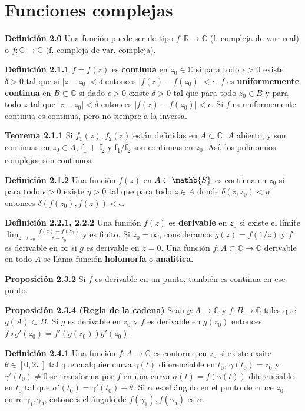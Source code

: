 \documentclass[a4paper, 11pt]{extarticle}
\newcommand{\tma}[1]{\textcolor{rojo}{\textbf{Teorema #1}}}
\newcommand{\propo}[1]{\textcolor{rojo}{\textbf{Proposición #1}}}
\newcommand{\defi}[1]{\textcolor{azul}{\textbf{Definición #1}}}
\begin{document}
\section*{Funciones complejas}
\label{sec:org47938e2}
\begin{multicols*}{2}
\defi{2.0} Una función puede ser de tipo \(f: \mathbb{R} \rightarrow
\mathbb{C}\) (f. compleja de var. real) o 
\(f: \mathbb{C} \rightarrow  \mathbb{C}\) (f. compleja de var. compleja).

\defi{2.1.1} \(f = f(z)\) es \textbf{continua} en \(z_0 \in \mathbb{C}\) si para todo \(\epsilon > 0\) existe \(\delta > 0\) tal que si \(|z - z_0| < \delta\)
entonces \(|f(z) - f(z_0)| < \epsilon\). \(f\) es \textbf{uniformemente continua} en
\(B \subset \mathbb{C}\) si
dado \(\epsilon > 0\) existe \(\delta > 0\) tal que para todo \(z_0 \in B\) y para todo \(z\) tal que \(|z-z_0| < \delta\) entonces \(|f(z) -
f(z_0)| < \epsilon\).  Si \(f\) es uniformemente continua es continua, pero
no siempre a la inversa.

\tma{2.1.1} Si \(f_1(z), f_2(z)\) están definidas en \(A \subset \mathbb{C}\), \(A\) abierto, y son continuas en \(z_0 \in A\), f\textsubscript{1} + f\textsubscript{2} y f\textsubscript{1}/f\textsubscript{2} son
continuas en \(z_0\). Así, los polinomios complejos son continuos.

\defi{2.1.2} Una función \(f(z)\) en \(A \subset \mathb{S}\) es continua en
\(z_0\) si para todo \(\epsilon > 0\)
 existe \(\eta > 0\) tal que para todo \(z \in A\) donde \(\delta(z, z_0) <
\eta\) entonces \(\delta(f(z_0), f(z)) < \epsilon\).

\defi{2.2.1, 2.2.2} Una función \(f(z)\) es \textbf{derivable} en \(z_0\) si existe el
límite \(\lim_{z \to z_0} \frac{f(z) - f(z_0)}{z-z_0}\) y es finito.
Si \(z_0 = \infty\), consideramos \(g(z) = f(1/z)\) y \(f\) es derivable
en \(\infty\) si \(g\) es derivable en \(z=0\).
Una función \(f:A \subset \mathbb{C} \rightarrow  \mathbb{C}\) derivable en todo
\(A\) se llama función \textbf{holomorfa} o \textbf{analítica.}

\propo{2.3.2} Si \(f\) es derivable en un punto, también es continua en ese
punto.

\propo{2.3.4 (Regla de la cadena)} Sean \(g:A \rightarrow  \mathbb{C}\) y \(f: B \rightarrow \mathbb{C}\) tales que \(g(A) \subset B\). Si \(g\) es
derivable en \(z_0\) y \(f\) es derivable en \(g(z_0)\) entonces \(f
\circ g'(z_0) = f'(g(z_0))g'(z_0)\).

\defi{2.4.1} Una función \(f: A \rightarrow  \mathbb{C}\) es conforme en \(z_0\) si existe exsite \(\theta \in [0, 2\pi]\) tal que cualquier curva \(\gamma(t)\) diferenciable en \(t_0\), \(\gamma(t_0) = z_0\) y \(\gamma'(t_0) \neq 0\) se transforma por \(f\) en una curva \(\sigma(t) =
f(\gamma(t))\) diferenciable en \(t_0\) tal que \(\sigma'(t_0) =
\gamma'(t_0) + \theta\). Si \(\alpha\) es el ángulo en el punto de cruce \(z_0\) entre \(\gamma_1, \gamma_2\), entonces el ángulo de \(f(\gamma_1),
f(\gamma_2)\) es \(\alpha\).  


\end{multicols*}
\end{document}
